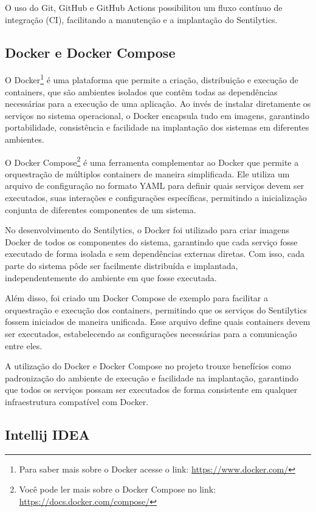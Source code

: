 \documentclass[
	12pt,				%
	oneside,			%
	a4paper,			%
	english,			%
	french,				%
	spanish,			%
	brazil				%
	]{abntex2}
\begin{document}
O uso do Git, GitHub e GitHub Actions possibilitou um fluxo contínuo de
integração (CI), facilitando a manutenção e a implantação do
Sentilytics.

\hypertarget{docker-e-docker-compose}{%
\subsection{Docker e Docker Compose}\label{docker-e-docker-compose}}

O Docker\footnote{Para saber mais sobre o Docker acesse o link:
  \url{https://www.docker.com/}} é uma plataforma que permite a criação,
distribuição e execução de containers, que são ambientes isolados que
contêm todas as dependências necessárias para a execução de uma
aplicação. Ao invés de instalar diretamente os serviços no sistema
operacional, o Docker encapsula tudo em imagens, garantindo
portabilidade, consistência e facilidade na implantação dos sistemas em
diferentes ambientes.

O Docker Compose\footnote{Você pode ler mais sobre o Docker Compose no
  link: \url{https://docs.docker.com/compose/}} é uma ferramenta
complementar ao Docker que permite a orquestração de múltiplos
containers de maneira simplificada. Ele utiliza um arquivo de
configuração no formato YAML para definir quais serviços devem ser
executados, suas interações e configurações específicas, permitindo a
inicialização conjunta de diferentes componentes de um sistema.

No desenvolvimento do Sentilytics, o Docker foi utilizado para criar
imagens Docker de todos os componentes do sistema, garantindo que cada
serviço fosse executado de forma isolada e sem dependências externas
diretas. Com isso, cada parte do sistema pôde ser facilmente distribuída
e implantada, independentemente do ambiente em que fosse executada.

Além disso, foi criado um Docker Compose de exemplo para facilitar a
orquestração e execução dos containers, permitindo que os serviços do
Sentilytics fossem iniciados de maneira unificada. Esse arquivo define
quais containers devem ser executados, estabelecendo as configurações
necessárias para a comunicação entre eles.

A utilização do Docker e Docker Compose no projeto trouxe benefícios
como padronização do ambiente de execução e facilidade na implantação,
garantindo que todos os serviços possam ser executados de forma
consistente em qualquer infraestrutura compatível com Docker.

\hypertarget{intellij-idea}{%
\subsection{Intellij IDEA}\label{intellij-idea}}
\end{document}
